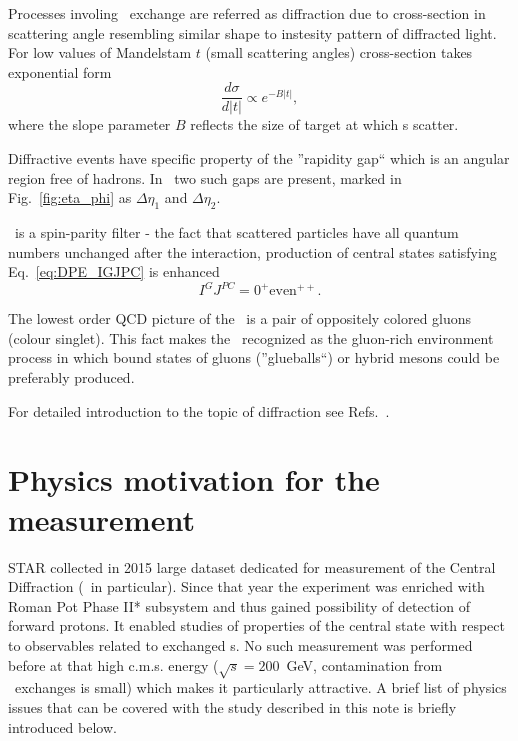 Processes involing \Pomeron\  exchange are referred as diffraction due to cross-section in scattering angle resembling similar shape to instesity pattern of diffracted light. For low values of Mandelstam $t$ (small scattering angles) cross-section takes exponential form\vspace{-2pt}
\begin{equation}
 \frac{d\sigma}{d|t|} \propto e^{-B|t|},
\end{equation}%
where the slope parameter $B$ reflects the size of target at which \Pomeron s scatter.

Diffractive events have specific property of the ''rapidity gap`` which is an angular region free of hadrons. In \DPE\ two such gaps are present, marked in Fig.~\ref{fig:eta_phi} as $\Delta\eta_{1}$ and $\Delta\eta_{2}$.%

\DPE\ is a spin-parity filter - the fact that scattered particles have all quantum numbers unchanged after the interaction, production of central states satisfying Eq.~\eqref{eq:DPE_IGJPC} is enhanced
\begin{equation}\label{eq:DPE_IGJPC}
 I^{G}J^{PC}=0^{+}\textrm{even}^{++}.
\end{equation}%

The lowest order QCD picture of the \Pomeron\ is a pair of oppositely colored gluons (colour singlet). This fact makes the \DPE\ recognized as the gluon-rich environment process in which bound states of gluons (''glueballs``) or hybrid mesons could be preferably produced.

For detailed introduction to the topic of diffraction see Refs.~\cite{pomeronAndQCD,barone}.\vspace*{-20pt}

\section{Physics motivation for the measurement}
STAR collected in 2015 large dataset dedicated for measurement of the Central Diffraction (\DPE\ in particular). Since that year the experiment was enriched with Roman Pot Phase II* subsystem and thus gained possibility of detection of forward protons. It enabled studies of properties of the central state with respect to observables related to exchanged \Pomeron s. No such measurement was performed before at that high c.m.s. energy ($\sqrt{s}=200$~GeV, contamination from \Reggeon\ exchanges is small) which makes it particularly attractive. A brief list of physics issues that can be covered with the study described in this note is briefly introduced below.%
%
